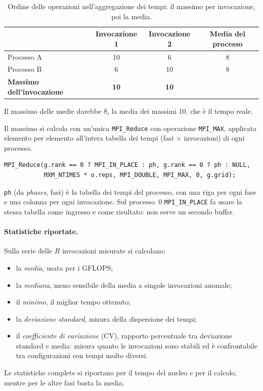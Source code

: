 \documentclass[11pt,a4paper]{article}
\begin{document}
\begin{table}[H]
  \centering
  \caption{Ordine delle operazioni nell'aggregazione dei tempi: il massimo per
    invocazione, poi la media.}\label{tab:aggregazione}
  \begin{tabular}{lccc}
    \toprule
     & Invocazione 1 & Invocazione 2 & Media del processo \\
    \midrule
    Processo A & 10 & 6  & 8 \\
    Processo B & 6  & 10 & 8 \\
    \midrule
    \textbf{Massimo dell'invocazione} & \textbf{10} & \textbf{10} & \\
    \bottomrule
  \end{tabular}
\end{table}

Il massimo delle medie darebbe 8, la media dei massimi 10, che è il tempo
reale.

Il massimo si calcola con un'unica \texttt{MPI\_Reduce} con operazione
\texttt{MPI\_MAX}, applicata elemento per elemento all'intera tabella dei tempi
(fasi $\times$ invocazioni) di ogni processo.

\begin{lstlisting}[caption={Massimo tra i processi dell'intera tabella dei tempi (\texttt{main.c}).}, label={lst:reduce-max}]
MPI_Reduce(g.rank == 0 ? MPI_IN_PLACE : ph, g.rank == 0 ? ph : NULL,
           MXM_NTIMES * o.reps, MPI_DOUBLE, MPI_MAX, 0, g.grid);
\end{lstlisting}
\texttt{ph} (da \emph{phases}, fasi) è la tabella dei tempi del processo, con
una riga per ogni fase e una colonna per ogni invocazione. Sul processo~0
\texttt{MPI\_IN\_PLACE} fa usare la stessa tabella come ingresso e come
risultato: non serve un secondo buffer.

\paragraph{Statistiche riportate.} Sulla serie delle $R$ invocazioni misurate
si calcolano:
\begin{itemize}
  \item la \emph{media}, usata per i GFLOPS;
  \item la \emph{mediana}, meno sensibile della media a singole invocazioni
        anomale;
  \item il \emph{minimo}, il miglior tempo ottenuto;
  \item la \emph{deviazione standard}, misura della dispersione dei tempi;
  \item il \emph{coefficiente di variazione} (CV), rapporto percentuale tra
        deviazione standard e media: misura quanto le invocazioni sono stabili
        ed è confrontabile tra configurazioni con tempi molto diversi.
\end{itemize}
Le statistiche complete si riportano per il tempo del nucleo e per il calcolo, mentre per le altre fasi basta la media.
\end{document}
